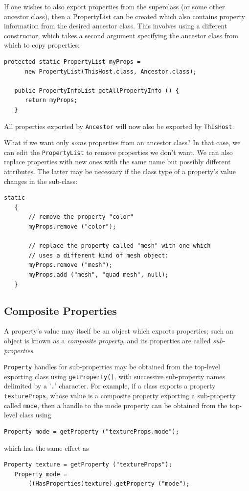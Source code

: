 \documentclass{article}
\begin{document}
If one wishes to also export properties from the superclass (or some
other ancestor class), then a PropertyList can be created which also
contains property information from the desired ancestor class.  This
involves using a different constructor, which takes a second argument
specifying the ancestor class from which to copy properties:
\begin{lstlisting}[]
   protected static PropertyList myProps = 
      new PropertyList(ThisHost.class, Ancestor.class);

   public PropertyInfoList getAllPropertyInfo () {
      return myProps;
   }
\end{lstlisting}
All properties exported by {\tt Ancestor} will now also be
exported by {\tt ThisHost}.

What if we want only {\it some} properties from an ancestor class?
In that case, we can edit the {\tt PropertyList} to remove
properties we don't want. We can also replace properties with
new ones with the same name but possibly different attributes.
The latter may be necessary if the class type of a property's
value changes in the sub-class:
\begin{lstlisting}[]
   static
   {
       // remove the property "color"
       myProps.remove ("color"); 

       // replace the property called "mesh" with one which
       // uses a different kind of mesh object:
       myProps.remove ("mesh");
       myProps.add ("mesh", "quad mesh", null); 
   }
\end{lstlisting}

\label{compositeSec}
\subsection{Composite Properties }

A property's value may itself be an object which exports properties;
such an object is known as a {\it composite property}, and
its properties are called {\it sub-properties}.

{\tt Property} handles for sub-properties may be obtained from the
top-level exporting class using {\tt getProperty()}, with successive
sub-property names delimited by a '{\tt .}' character.  For example,
if a class exports a property {\tt textureProps}, whose value is a
composite property exporting a sub-property called {\tt mode}, then a
handle to the mode property can be obtained from the top-level class
using
\begin{lstlisting}[]
   Property mode = getProperty ("textureProps.mode");    
\end{lstlisting}
which has the same effect as
\begin{lstlisting}[]
   Property texture = getProperty ("textureProps");    
   Property mode = 
       ((HasProperties)texture).getProperty ("mode");
\end{lstlisting}
\end{document}
